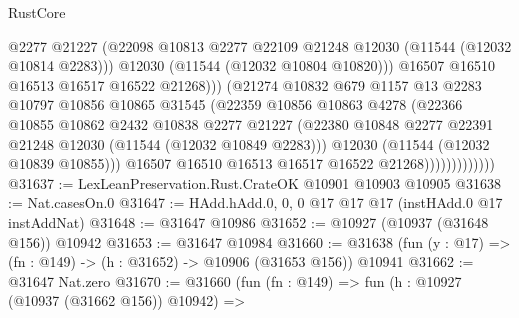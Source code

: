\begin{lexlean}{RustCore}
\begin{coremodule}
                                  @2277
                                  @21227
                                  (@22098
                                    @10813
                                    @2277
                                    @22109
                                    @21248
                                    @12030
                                    (@11544 (@12032 @10814 @2283)))
                                  @12030
                                  (@11544 (@12032 @10804 @10820)))
                                @16507
                                @16510
                                @16513
                                @16517
                                @16522
                                @21268)))
                          (@21274
                            @10832
                            @679
                            @1157
                            @13
                            @2283
                            @10797
                            @10856
                            @10865
                            @31545
                            (@22359
                              @10856
                              @10863
                              @4278
                              (@22366
                                @10855
                                @10862
                                @2432
                                @10838
                                @2277
                                @21227
                                (@22380
                                  @10848
                                  @2277
                                  @22391
                                  @21248
                                  @12030
                                  (@11544 (@12032 @10849 @2283)))
                                @12030
                                (@11544 (@12032 @10839 @10855)))
                              @16507
                              @16510
                              @16513
                              @16517
                              @16522
                              @21268)))))))))))))
@31637 := LexLeanPreservation.Rust.CrateOK @10901 @10903 @10905
@31638 := Nat.casesOn.{0}
@31647 := HAdd.hAdd.{0, 0, 0} @17 @17 @17 (instHAdd.{0} @17 instAddNat)
@31648 := @31647 @10986
@31652 := @10927 (@10937 (@31648 @156)) @10942
@31653 := @31647 @10984
@31660 := @31638 (fun (y : @17) => (fn : @149) -> (h : @31652) -> @10906 (@31653 @156)) @10941
@31662 := @31647 Nat.zero
@31670 := @31660
    (fun (fn : @149) =>
    fun (h : @10927 (@10937 (@31662 @156)) @10942) =>

\end{coremodule}
\end{lexlean}
